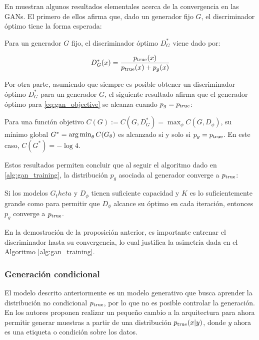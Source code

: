 En \cite{goodfellow2014generative} muestran algunos resultados elementales acerca de la convergencia en las GANs. El primero de ellos afirma que, dado un generador fijo $G$, el discriminador óptimo tiene la forma esperada:

\begin{prop}
	Para un generador $G$ fijo, el discriminador óptimo $D^*_G$ viene dado por:

	\begin{equation}
		D^*_G(x) = \frac{p_{\operatorname{true}}(x)}{p_{\operatorname{true}}(x) + p_g(x)}
	\end{equation}
\end{prop}

Por otra parte, asumiendo que siempre es posible obtener un discriminador óptimo $D_G^*$ para un generador $G$, el siguiente resultado afirma que el generador óptimo para \eqref{eq:gan_objective} se alcanza cuando $p_g=p_{\operatorname{true}}$:

\begin{prop}

	Para una función objetivo $C(G):=C(G, D_G^*) = \max_\phi C(G, D_\phi)$, su mínimo global $G^*=\operatorname*{arg\,min}_\theta C(G_\theta)$ es alcanzado si y solo si $p_g=p_{\operatorname{true}}$. En este caso, $C(G^*)=-\log 4$.
\end{prop}

Estos resultados permiten concluir que al seguir el algoritmo dado en \ref{alg:gan_training}, la distribución $p_g$ asociada al generador converge a $p_{\operatorname{true}}$:

\begin{prop}
	Si los modelos $G_theta$ y $D_\phi$ tienen suficiente capacidad y $K$ es lo suficientemente grande como para permitir que $D_\phi$ alcance su óptimo en cada iteración, entonces $p_g$ converge a $p_{\operatorname{true}}$.
\end{prop}

En la demostración de la proposición anterior, es importante entrenar el discriminador hasta su convergencia, lo cual justifica la asimetría dada en el Algoritmo \ref{alg:gan_training}.

\subsubsection{Generación condicional}

El modelo descrito anteriormente es un modelo generativo que busca aprender la distribución no condicional $p_{\operatorname{true}}$, por lo que no es posible controlar la generación. En \cite{mirza2014conditional} los autores proponen realizar un pequeño cambio a la arquitectura para ahora permitir generar muestras a partir de una distribución $p_{\operatorname{true}}(x|y)$, donde $y$ ahora es una etiqueta o condición sobre los datos.

